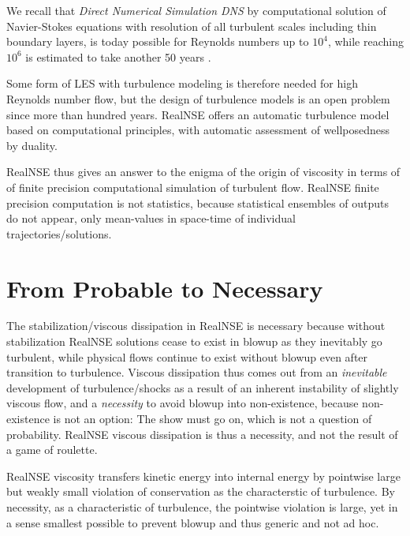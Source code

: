 We recall that \emph{Direct Numerical Simulation DNS} 
by computational solution of Navier-Stokes equations 
with resolution of all turbulent scales including thin boundary layers, is 
today possible for Reynolds numbers up to $10^4$, 
while reaching $10^6$ is estimated to take another 50 years \cite{henningsonnyteknik,moin}.

Some form of LES with turbulence modeling is therefore needed for high Reynolds
number flow,  but the design of turbulence models is an open problem since
more than hundred years. RealNSE offers an automatic turbulence model based on
computational principles, with automatic assessment of
wellposedness by duality.

RealNSE thus gives an answer to the enigma of the origin of viscosity
in terms of of finite precision computational simulation of turbulent flow.
RealNSE finite precision computation is not statistics, because  
statistical ensembles of outputs do not appear, only mean-values in space-time
of individual trajectories/solutions.    

 

\section{From Probable to Necessary}

The stabilization/viscous dissipation in RealNSE  is necessary because without stabilization RealNSE 
solutions cease to exist in blowup as they inevitably go turbulent, 
while physical flows continue to exist without blowup even after 
transition to turbulence. Viscous dissipation thus
comes out from an \emph{inevitable} development of turbulence/shocks
as a result of an inherent instability of slightly viscous flow,
and a \emph{necessity} to avoid blowup into non-existence,
because non-existence is not an option: The show must go on,
which is not a question of probability. RealNSE viscous dissipation is
thus a necessity, and not the result of a game of roulette.

RealNSE viscosity transfers kinetic energy into internal energy
by pointwise large but weakly small violation of conservation as 
the characterstic of turbulence.
By necessity, as a characteristic of turbulence, the pointwise violation is 
large, yet in a sense smallest possible to prevent blowup and thus
generic and not ad hoc. 




